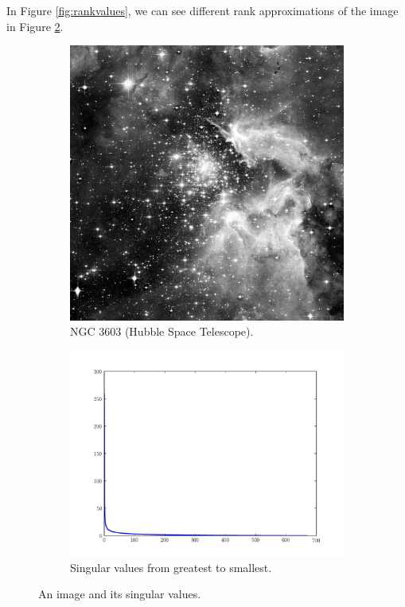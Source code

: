 
In Figure \ref{fig:rankvalues}, we can see different rank approximations of the image in Figure \ref{fig:hubble}.

\begin{figure}
\centering
\begin{subfigure}[b]{.49\textwidth}
\centering
\includegraphics[width=\textwidth]{hubble_red}
\caption{NGC 3603 (Hubble Space Telescope).}
\end{subfigure}
\begin{subfigure}[b]{.49\textwidth}
\centering
\includegraphics[width=\textwidth]{hubble_svals}
\caption{Singular values from greatest to smallest.}
\label{fig:svals_plot}
\end{subfigure}
\caption{An image and its singular values.}
\label{fig:hubble}
\end{figure}

